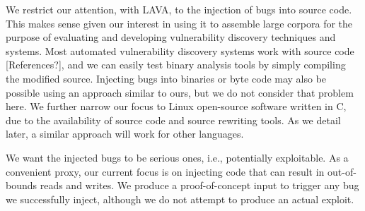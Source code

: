 
We restrict our attention, with LAVA, to the injection of bugs into source code.
This makes sense given our interest in using it to assemble large corpora for the purpose of evaluating and developing vulnerability discovery techniques and systems.
Most automated vulnerability discovery systems work with source code [References?], and we can easily test binary analysis tools by simply compiling the modified source.
Injecting bugs into binaries or byte code may also be possible using an approach similar to ours, but we do not consider that problem here.
We further narrow our focus to Linux open-source software written in C, due to the availability of source code and source rewriting tools.
As we detail later, a similar approach will work for other languages.

We want the injected bugs to be serious ones, i.e., potentially exploitable.
As a convenient proxy, our current focus is on injecting code that can result in out-of-bounds reads and writes.  
We produce a proof-of-concept input to trigger any bug we successfully inject, although we do not attempt to produce an actual exploit.
